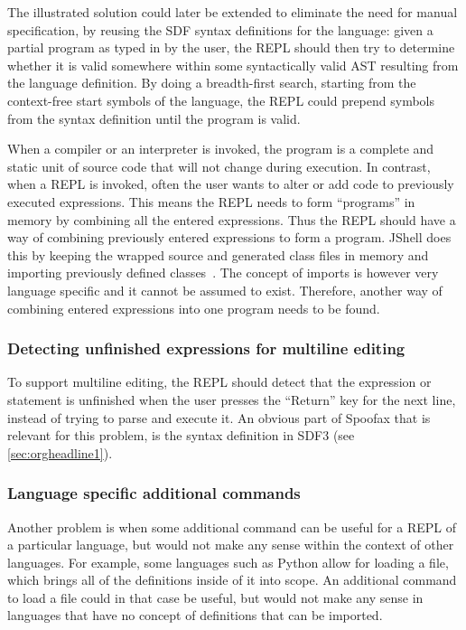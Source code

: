 The illustrated solution could later be extended to eliminate the need for
manual specification, by reusing the SDF syntax definitions for the language:
given a partial program as typed in by the user, the REPL should then try to
determine whether it is valid somewhere within some syntactically valid AST
resulting from the language definition. By doing a breadth-first search,
starting from the context-free start symbols of the language, the REPL could
prepend symbols from the syntax definition until the program is valid.

When a compiler or an interpreter is invoked, the program is a complete and
static unit of source code that will not change during execution. In contrast,
when a REPL is invoked, often the user wants to alter or add code to previously
executed expressions. This means the REPL needs to form ``programs'' in memory
by combining all the entered expressions.  Thus the REPL should have a way of
combining previously entered expressions to form a program. JShell does this by
keeping the wrapped source and generated class files in memory and importing
previously defined classes~\cite{jshell-repl}. The concept of imports is
however very language specific and it cannot be assumed to exist.  Therefore,
another way of combining entered expressions into one program needs to be
found.

\subsubsection{Detecting unfinished expressions for multiline editing}
\label{sec:detect-unfin-expr}
To support multiline editing, the REPL should detect that the
expression or statement is unfinished when the user presses the
``Return'' key for the next line, instead of trying to parse and
execute it. An obvious part of Spoofax that is relevant for this
problem, is the syntax definition in SDF3 (see
\cref{sec:orgheadline1}).

\subsubsection{Language specific additional commands}
\label{sec:lang-spec-addit}
Another problem is when some additional command can be useful for a
REPL of a particular language, but would not make any sense within the
context of other languages. For example, some languages such as Python
allow for loading a file, which brings all of the definitions inside
of it into scope. An additional command to load a file could in that
case be useful, but would not make any sense in languages that have no
concept of definitions that can be imported.

